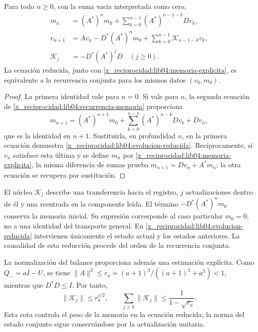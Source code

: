 \begin{proposition}
\label{x_reciprocidad:lib04:prop-memoria-reducida}
Para todo \(n\geq0\), con la suma vacía interpretada como cero,
\begin{align}
 m_n&=(A^*)^n m_0+
       \sum_{k=0}^{n-1}(A^*)^{n-1-k}Dv_k,
       \label{x_reciprocidad:lib04:memoria-explicita}\\
 v_{n+1}&=Av_n-D^*(A^*)^n m_0
       +\sum_{k=0}^{n-1}\mathscr K_{n-1-k}v_k,
       \label{x_reciprocidad:lib04:evolucion-reducida}\\
 \mathscr K_j&=-D^*(A^*)^jD\quad(j\geq0).
       \label{x_reciprocidad:lib04:nucleo-retardo}
\end{align}
La ecuación reducida, junto con \eqref{x_reciprocidad:lib04:memoria-explicita}, es
equivalente a la recurrencia conjunta para los mismos datos \((v_0,m_0)\).
\end{proposition}
\begin{proof}
La primera identidad vale para \(n=0\). Si vale para \(n\), la segunda
ecuación de \eqref{x_reciprocidad:lib04:recurrencia-memoria} proporciona
\[
 m_{n+1}=(A^*)^{n+1}m_0+
 \sum_{k=0}^{n-1}(A^*)^{n-k}Dv_k+Dv_n,
\]
que es la identidad en \(n+1\). Sustituirla, en profundidad \(n\), en
la primera ecuación demuestra \eqref{x_reciprocidad:lib04:evolucion-reducida}.
Recíprocamente, si \(v_n\) satisface esta última y se define \(m_n\)
por \eqref{x_reciprocidad:lib04:memoria-explicita}, la misma diferencia de sumas prueba
\(m_{n+1}=Dv_n+A^*m_n\); la otra ecuación se recupera por sustitución.
\end{proof}

El núcleo \(\mathscr K_j\) describe una transferencia hacia el registro,
\(j\) actualizaciones dentro de él y una reentrada en la componente leída.
El término \(-D^*(A^*)^nm_0\) conserva la memoria inicial. Su supresión
corresponde al caso particular \(m_0=0\), no a una identidad del transporte
general. En \eqref{x_reciprocidad:lib04:evolucion-reducida} intervienen únicamente el
estado actual y los estados anteriores. La causalidad de esta reducción
procede del orden de la recurrencia conjunta.

La normalización del balance proporciona además una estimación explícita.
Como \(Q_-=aI-U\), se tiene
\(\|A\|^2\leq r_a=(a+1)^3/((a+1)^3+a^3)<1\), mientras que
\(D^*D\leq I\). Por tanto,
\begin{equation}
 \|\mathscr K_j\|\leq r_a^{j/2},\qquad
 \sum_{j\geq0}\|\mathscr K_j\|
 \leq\frac{1}{1-\sqrt{r_a}}.
 \label{x_reciprocidad:lib04:cota-nucleo-retardo}
\end{equation}
Esta cota controla el peso de la memoria en la ecuación reducida; la norma
del estado conjunto sigue conservándose por la actualización unitaria.

